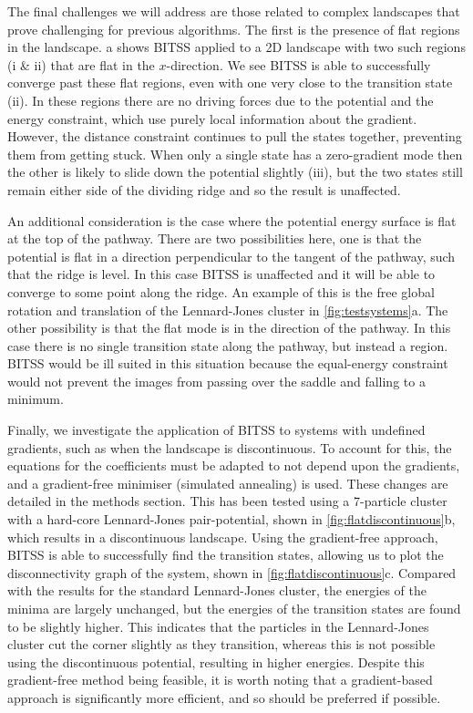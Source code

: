 \documentclass[aip,jcp,reprint,twocolumn]{revtex4-1}
\begin{document}
The final challenges we will address are those related to complex landscapes that prove challenging for previous algorithms.
The first is the presence of flat regions in the landscape.
a shows BITSS applied to a 2D landscape with two such regions (i \& ii) that are flat in the $x$-direction.
We see BITSS is able to successfully converge past these flat regions, even with one very close to the transition state (ii).
In these regions there are no driving forces due to the potential and the energy constraint, which use purely local information about the gradient.
However, the distance constraint continues to pull the states together, preventing them from getting stuck.
When only a single state has a zero-gradient mode then the other is likely to slide down the potential slightly (iii), but the two states still remain either side of the dividing ridge and so the result is unaffected.

An additional consideration is the case where the potential energy surface is flat at the top of the pathway.
There are two possibilities here, one is that the potential is flat in a direction perpendicular to the tangent of the pathway, such that the ridge is level.
In this case BITSS is unaffected and it will be able to converge to some point along the ridge.
An example of this is the free global rotation and translation of the Lennard-Jones cluster in \cref{fig:testsystems}a.
The other possibility is that the flat mode is in the direction of the pathway.
In this case there is no single transition state along the pathway, but instead a region.
BITSS would be ill suited in this situation because the equal-energy constraint would not prevent the images from passing over the saddle and falling to a minimum.

Finally, we investigate the application of BITSS to systems with undefined gradients, such as when the landscape is discontinuous.
To account for this, the equations for the coefficients must be adapted to not depend upon the gradients, and a gradient-free minimiser (simulated annealing) is used.
These changes are detailed in the methods section.
This has been tested using a 7-particle cluster with a hard-core Lennard-Jones pair-potential, shown in \cref{fig:flatdiscontinuous}b, which results in a discontinuous landscape.
Using the gradient-free approach, BITSS is able to successfully find the transition states, allowing us to plot the disconnectivity graph of the system, shown in \cref{fig:flatdiscontinuous}c.
Compared with the results for the standard Lennard-Jones cluster, the energies of the minima are largely unchanged, but the energies of the transition states are found to be slightly higher.
This indicates that the particles in the Lennard-Jones cluster cut the corner slightly as they transition, whereas this is not possible using the discontinuous potential, resulting in higher energies.
Despite this gradient-free method being feasible, it is worth noting that a gradient-based approach is significantly more efficient, and so should be preferred if possible.
\end{document}
